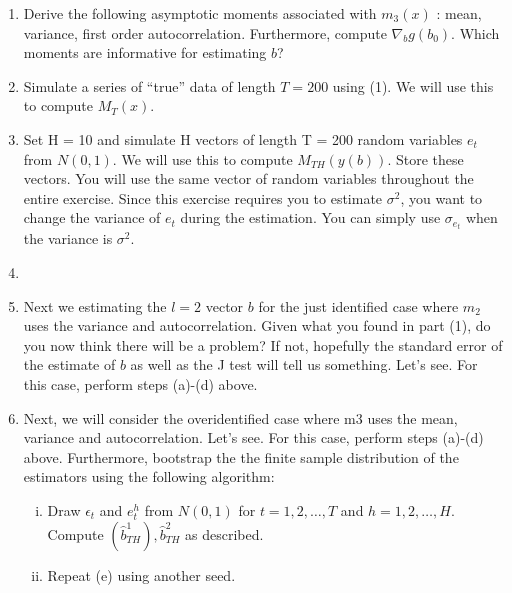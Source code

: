 \documentclass{article} %
\theoremstyle{definition}
\begin{document}
	
	\begin{enumerate}
		\item Derive the following asymptotic moments associated with $ m_3(x) $ : mean, variance, first order autocorrelation. Furthermore, compute $ \nabla_b g(b_0) $. Which moments are informative for estimating $ b $?
		
		\item Simulate a series of “true” data of length $ T = 200 $ using (1). We will use this to compute
		$ M_T (x) $.
		
		\item Set H = 10 and simulate H vectors of length T = 200 random variables $ e_t $ from $ N(0, 1) $. We will use this to compute $ M_{TH}(y(b)) $. Store these vectors. You will use the same vector of random variables throughout the entire exercise. Since this exercise requires you to estimate $ \sigma^2 $, you want to change the variance of $ e_t $ during the estimation. You can simply use $ \sigma_{e_t} $ when the variance is $ \sigma^2 $.
		
		\item 
		
		\item Next we estimating the $ l = 2 $ vector $ b $ for the just identified case where $ m_2 $ uses the variance and autocorrelation. Given what you found in part (1), do you now think there will be a problem? If not, hopefully the standard error of the estimate of $ b $ as well as the J test will tell us something. Let’s see. For this case, perform steps (a)-(d) above.
		
		\item Next, we will consider the overidentified case where m3 uses the mean, variance and autocorrelation. Let’s see. For this case, perform steps (a)-(d) above. Furthermore, bootstrap the the finite sample distribution of the estimators using the following algorithm:
		\begin{enumerate}[i.]
			\item Draw $ \epsilon_t $ and $ e_t^h $ from $ N(0,1) $ for $ t = 1,2,\hdots,T $ and $ h = 1,2,\hdots,H $. Compute $ (\hat{b}_{TH}^1), \hat{b}_{TH}^2 $ as described.
			
			\item Repeat (e) using another seed.
		\end{enumerate}
	
	\end{enumerate}
\end{document}
